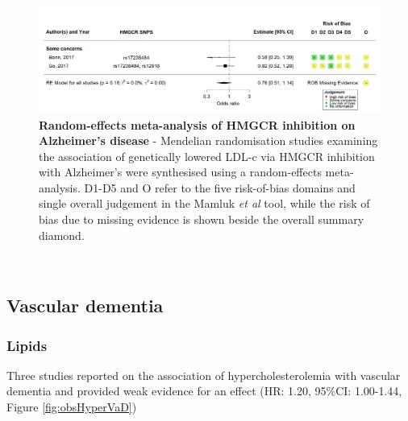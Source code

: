 \documentclass[a4paper, twoside]{templates/ociamthesis}
\begin{document}
\begin{figure}[H]
\includegraphics[width=1\linewidth]{figures/sys-rev/fp_MR_HMGCR_AD} \caption[Random-effects meta-analysis of HMGCR inhibition on Alzheimer's disease]{\textbf{Random-effects meta-analysis of HMGCR inhibition on Alzheimer's disease} - Mendelian randomisation studies examining the association of genetically lowered LDL-c via HMGCR inhibition with Alzheimer's were synthesised using a random-effects meta-analysis. D1-D5 and O refer to the five risk-of-bias domains and single overall judgement in the Mamluk \emph{et al} tool, while the risk of bias due to missing evidence is shown beside the overall summary diamond.}\label{fig:mrStatinADFig}
\end{figure}

~

\hypertarget{sys-rev-res-VaD}{%
\subsection{Vascular dementia}\label{sys-rev-res-VaD}}

\hypertarget{lipids-2}{%
\subsubsection{Lipids}\label{lipids-2}}

Three studies reported on the association of hypercholesterolemia with vascular dementia and provided weak evidence for an effect (HR: 1.20, 95\%CI: 1.00-1.44, Figure \ref{fig:obsHyperVaD})
\end{document}

